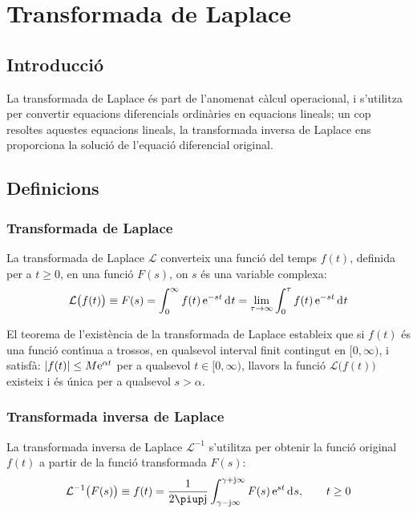 \chapter{Transformada de
Laplace}\label{sec:laplace}

\section{Introducci\'{o}}
La transformada de Laplace \'{e}s part de l'anomenat c\`{a}lcul operacional,
i s'utilitza per convertir equacions diferencials ordin\`{a}ries en
equacions lineals; un cop resoltes aquestes equacions lineals, la
transformada inversa de Laplace ens proporciona la soluci\'{o} de
l'equaci\'{o} diferencial original.

\section{Definicions}

\subsection{Transformada de Laplace}

La transformada de Laplace $\mathcal{L}$  converteix una funci\'{o} del
temps $f(t)$, definida per a $t\geq 0$, en una funci\'{o} $F(s)$, on $s$
\'{e}s una variable complexa:
\begin{equation}
    \mathcal{L}\bigl(f(t)\bigr) \equiv F(s) = \int_0^\infty f(t) \,\eu^{-s t} \diff t =
    \lim_{\tau\to\infty} \int_0^\tau f(t) \,\eu^{-s t} \diff t \label{eq:transf_laplace}
\end{equation}

El teorema de l'exist\`{e}ncia de la transformada de Laplace estableix
que si $f(t)$ \'{e}s una funci\'{o} cont\'{\i}nua a trossos, en qualsevol
interval finit contingut en $[0,\infty)$, i satisf\`{a}: $|f(t)| \leq M
\mathrm{e}^{\alpha t}$ per a qualsevol $t \in [0,\infty)$, llavors la
funci\'{o} $\mathcal{L}\bigl(f(t)\bigr)$ existeix i \'{e}s \'{u}nica per a
qualsevol $s > \alpha$.

\subsection{Transformada inversa de Laplace}

La transformada inversa de Laplace $\mathcal{L}^{-1}$ s'utilitza per
obtenir la funci\'{o} original $f(t)$ a partir de la funci\'{o}
transformada $F(s)$:
\begin{equation}
    \mathcal{L}^{-1}\bigl(F(s)\bigr) \equiv f(t) = \frac{1}{2 \piup \ju }
    \int_{\gamma-\ju \infty}^{\gamma+\ju \infty} F(s)\, \eu^{s t} \diff s
    ,\qquad t\geq 0 \label{eq:transf_inv_laplace}
\end{equation}

